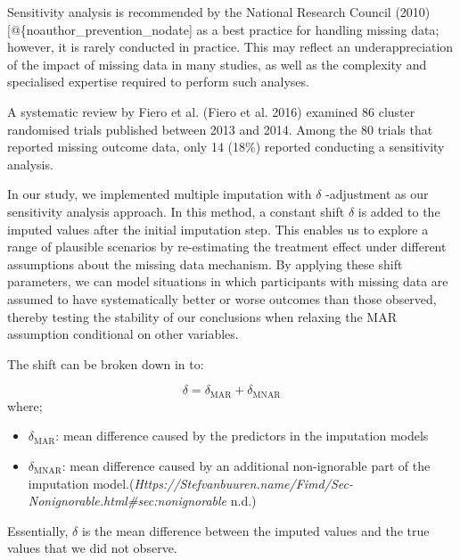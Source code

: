 \documentclass{article}
\providecommand{\tightlist}{%
  \setlength{\itemsep}{0pt}\setlength{\parskip}{0pt}}
\begin{document}
Sensitivity analysis is recommended by the National Research Council
(2010) {[}@\{noauthor\_prevention\_nodate{]} as a best practice for
handling missing data; however, it is rarely conducted in practice. This
may reflect an underappreciation of the impact of missing data in many
studies, as well as the complexity and specialised expertise required to
perform such analyses.

A systematic review by Fiero et al. (Fiero et al. 2016) examined 86
cluster randomised trials published between 2013 and 2014. Among the 80
trials that reported missing outcome data, only 14 (18\%) reported
conducting a sensitivity analysis.

In our study, we implemented multiple imputation with \(\delta\)
-adjustment as our sensitivity analysis approach. In this method, a
constant shift \(\delta\) is added to the imputed values after the
initial imputation step. This enables us to explore a range of plausible
scenarios by re-estimating the treatment effect under different
assumptions about the missing data mechanism. By applying these shift
parameters, we can model situations in which participants with missing
data are assumed to have systematically better or worse outcomes than
those observed, thereby testing the stability of our conclusions when
relaxing the MAR assumption conditional on other variables.

The shift can be broken down in to:

\[\delta = \delta_\mathrm{MAR} + \delta_\mathrm{MNAR}\] where;

\begin{itemize}
\tightlist
\item
  \(\delta_\mathrm{MAR}\): mean difference caused by the predictors in
  the imputation models
\item
  \(\delta_\mathrm{MNAR}\): mean difference caused by an additional
  non-ignorable part of the imputation
  model.(\emph{Https://Stefvanbuuren.name/Fimd/Sec-Nonignorable.html\#sec:nonignorable}
  n.d.)
\end{itemize}

Essentially, \(\delta\) is the mean difference between the imputed
values and the true values that we did not observe.
\end{document}
